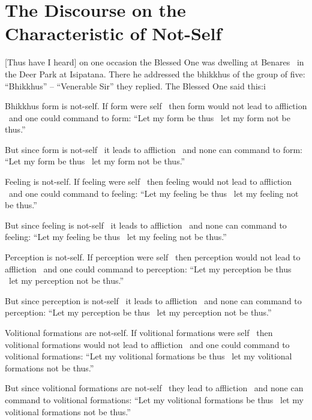 \section{The Discourse on the Characteristic of Not-Self}
\label{characteristic-of-not-self}

[Thus have I heard] on one occasion the Blessed One was dwelling at Benares \breathmark\ in the Deer Park at Isipatana. There he addressed the bhikkhus of the group of five: ``Bhikkhus'' – ``Venerable Sir'' they replied. The Blessed One said this:i

Bhikkhus form is not-self. If form were self \breathmark\ then form would not lead to affliction \breathmark\ and one could command to form: ``Let my form be thus \breathmark\ let my form not be thus.''

But since form is not-self \breathmark\ it leads to affliction \breathmark\ and none can command to form: ``Let my form be thus \breathmark\ let my form not be thus.''

Feeling is not-self. If feeling were self \breathmark\ then feeling would not lead to affliction \breathmark\ and one could command to feeling: ``Let my feeling be thus \breathmark\ let my feeling not be thus.''

But since feeling is not-self \breathmark\ it leads to affliction \breathmark\ and none can command to feeling: ``Let my feeling be thus \breathmark\ let my feeling not be thus.''

Perception is not-self. If perception were self \breathmark\ then perception would not lead to affliction \breathmark\ and one could command to perception: ``Let my perception be thus \breathmark\ let my perception not be thus.''

But since perception is not-self \breathmark\ it leads to affliction \breathmark\ and none can command to perception: ``Let my perception be thus \breathmark\ let my perception not be thus.''

Volitional formations are not-self. If volitional formations were self \breathmark\ then volitional formations would not lead to affliction \breathmark\ and one could command to volitional formations: ``Let my volitional formations be thus \breathmark\ let my volitional formations not be thus.''

But since volitional formations are not-self \breathmark\ they lead to affliction \breathmark\ and none can command to volitional formations: ``Let my volitional formations be thus \breathmark\ let my volitional formations not be thus.''

